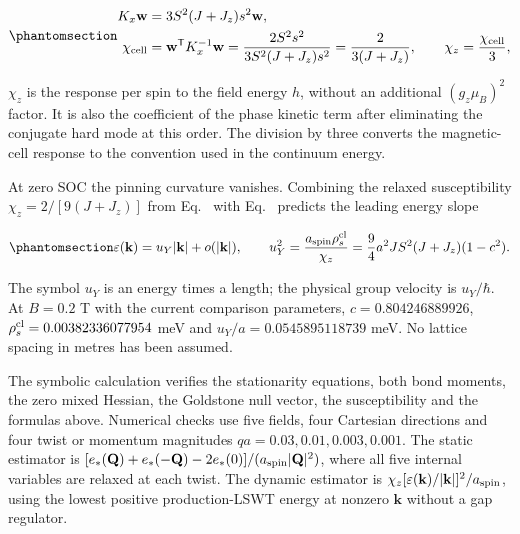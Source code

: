 \begin{equation}\phantomsection\label{eq-nbcp-y-hessian-response}{
\begin{aligned}
K_x\mathbf w&=3S^2(J+J_z)s^2\mathbf w,\\
\chi_{\rm cell}&=\mathbf w^{\mathsf T}K_x^{-1}\mathbf w
=\frac{2S^2s^2}{3S^2(J+J_z)s^2}
=\frac{2}{3(J+J_z)},\qquad
\chi_z=\frac{\chi_{\rm cell}}{3},
\end{aligned}
}\end{equation}

\(\chi_z\) is the response per spin to the field energy \(h\), without
an additional \((g_z\mu_B)^2\) factor. It is also the coefficient of the
phase kinetic term after eliminating the conjugate hard mode at this
order. The division by three converts the magnetic-cell response to the
convention used in the continuum energy.

At zero SOC the pinning curvature vanishes. Combining the relaxed
susceptibility \(\chi_z=2/[9(J+J_z)]\) from
Eq.~ with
Eq.~ predicts the leading energy slope

\begin{equation}\phantomsection\label{eq-nbcp-y-stiffness-dispersion}{
\varepsilon(\mathbf k)=u_Y|\mathbf k|+o(|\mathbf k|),
\qquad
u_Y^2=\frac{a_{\rm spin}\rho_s^{\rm cl}}{\chi_z}
=\frac94 a^2JS^2(J+J_z)(1-c^2).
}\end{equation}

The symbol \(u_Y\) is an energy times a length; the physical group
velocity is \(u_Y/\hbar\). At \(B=0.2\) T with the current comparison
parameters, \(c=0.804246889926\), \(\rho_s^{\rm cl}=0.00382336077954\)
meV and \(u_Y/a=0.0545895118739\) meV. No lattice spacing in metres has
been assumed.

The symbolic calculation verifies the stationarity equations, both bond
moments, the zero mixed Hessian, the Goldstone null vector, the
susceptibility and the formulas above. Numerical checks use five fields,
four Cartesian directions and four twist or momentum magnitudes
\(qa=0.03,0.01,0.003,0.001\). The static estimator is
\([e_*(\mathbf Q)+e_*(-\mathbf Q)-2e_*(0)]/(a_{\rm spin}|\mathbf Q|^2)\),
where all five internal variables are relaxed at each twist. The dynamic
estimator is
\(\chi_z[\varepsilon(\mathbf k)/|\mathbf k|]^2/a_{\rm spin}\), using the
lowest positive production-LSWT energy at nonzero \(\mathbf k\) without
a gap regulator.

